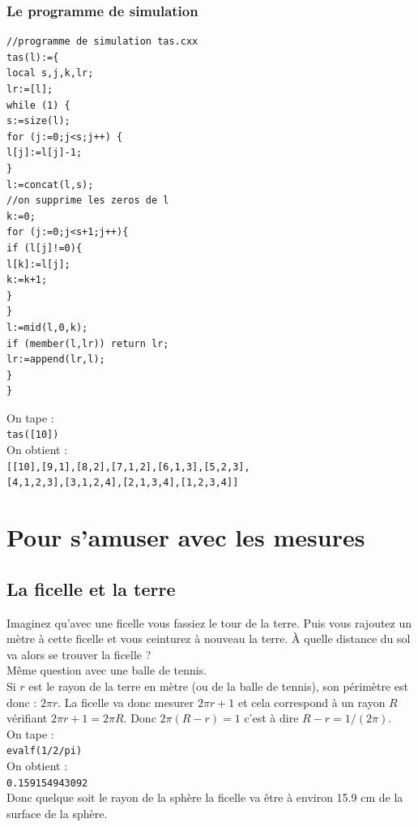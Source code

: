 \documentclass[a4paper,11pt]{book}
\begin{document}
\subsection{Le programme de simulation}
\begin{verbatim}
//programme de simulation tas.cxx
tas(l):={
local s,j,k,lr;
lr:=[l];
while (1) {
s:=size(l);
for (j:=0;j<s;j++) {
l[j]:=l[j]-1;
}
l:=concat(l,s);
//on supprime les zeros de l
k:=0;
for (j:=0;j<s+1;j++){
if (l[j]!=0){
l[k]:=l[j];
k:=k+1;
}
}
l:=mid(l,0,k);
if (member(l,lr)) return lr;
lr:=append(lr,l);
}
}

\end{verbatim}
On tape :\\
{\tt tas([10])}\\
On obtient :\\
{\tt [[10],[9,1],[8,2],[7,1,2],[6,1,3],[5,2,3],} \\
{\tt [4,1,2,3],[3,1,2,4],[2,1,3,4],[1,2,3,4]]}
\chapter{Pour s'amuser avec les mesures}
\section{La ficelle et la terre}
Imaginez qu'avec une ficelle vous fassiez le tour de la terre. Puis vous 
rajoutez un m\`etre \`a cette ficelle et vous ceinturez \`a nouveau la terre. 
\`A quelle distance du sol va alors se trouver la ficelle ?\\
M\^eme question avec une balle de tennis.\\

Si $r$ est le rayon de la terre en m\`etre (ou de la balle de tennis), son 
p\'erim\`etre est donc : $2\pi r$. La ficelle va donc mesurer $2\pi r+1$ et 
cela correspond \`a un rayon $R$ v\'erifiant $2\pi r+1=2\pi R$.
Donc $2\pi (R-r)=1$ c'est \`a dire $R-r=1/(2\pi)$.\\
On tape :\\
{\tt evalf(1/2/pi)}\\
On obtient :\\
{\tt 0.159154943092}\\
Donc quelque soit le rayon de la sph\`ere la ficelle va \^etre \`a environ 
15.9 cm de la surface de la sph\`ere.
\end{document}
